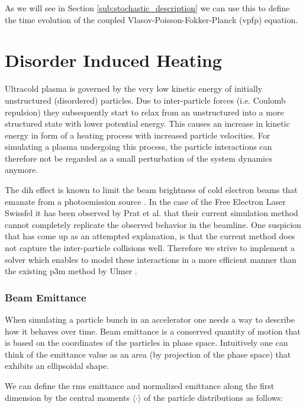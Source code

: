 As we will see in Section \ref{sub:stochastic_description} we can use this to define the time
evolution of the coupled Vlasov-Poisson-Fokker-Planck (\gls{vpfp}) equation.

\section{Disorder Induced Heating}
\label{section:dihProblem}

Ultracold plasma is governed by the very low kinetic energy of initially unstructured
(disordered) particles.
Due to inter-particle forces (i.e. Coulomb repulsion) they subsequently start to relax from an unstructured into a more
structured state with lower potential energy. This causes an increase in kinetic energy in form of
a heating process with increased particle velocities.
For simulating a plasma undergoing this process, the particle interactions can therefore not be regarded as a small
perturbation of the system dynamics anymore.

The \gls{dih} effect is known to limit the beam brightness of cold electron beams that emanate from
a photoemission source \cite{Maxson_2013}.
In the case of the Free Electron Laser Swiss\gls{fel} it has been observed by Prat et al.
\cite{prat2022energy} that their current simulation method cannot completely replicate the observed behavior
in the beamline.
One suspicion that has come up as an attempted explanation, is that the current method does not
capture the inter-particle collisions well.
Therefore we strive to implement a solver which enables to model these interactions in a more efficient manner than the
existing \gls{p3m} method by Ulmer \cite{p3m_ulmer}.

\subsubsection{Beam Emittance}

When simulating a particle bunch in an accelerator one needs a way to describe how it behaves over
time.
Beam emittance is a conserved quantity of motion that is based on the coordinates of the particles
in phase space.
Intuitively one can think of the emittance value as an area (by projection of the phase space) that
exhibits an ellipsoidal shape.

We can define the \gls{rms} emittance and normalized emittance along the first dimension by the central moments $\langle \cdot \rangle$ of the particle
distributions as follows:

